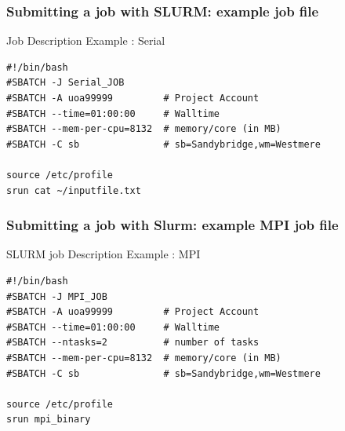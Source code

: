 \documentclass{beamer}
\begin{document}
\begin{frame}
  \frametitle{Submitting a job with SLURM: example job file}
\begin{block}{Job Description Example : Serial}
\begin{scriptsize}
\begin{verbatim}
#!/bin/bash
#SBATCH -J Serial_JOB
#SBATCH -A uoa99999         # Project Account
#SBATCH --time=01:00:00     # Walltime
#SBATCH --mem-per-cpu=8132  # memory/core (in MB)
#SBATCH -C sb               # sb=Sandybridge,wm=Westmere

source /etc/profile
srun cat ~/inputfile.txt
\end{verbatim}
\end{scriptsize}
  \end{block}
\end{frame}


\begin{frame}
  \frametitle{Submitting a job with Slurm: example MPI job file}
     \begin{block}{SLURM job Description Example : MPI}
\begin{scriptsize}
\begin{verbatim}
#!/bin/bash
#SBATCH -J MPI_JOB
#SBATCH -A uoa99999         # Project Account
#SBATCH --time=01:00:00     # Walltime
#SBATCH --ntasks=2          # number of tasks
#SBATCH --mem-per-cpu=8132  # memory/core (in MB)
#SBATCH -C sb               # sb=Sandybridge,wm=Westmere

source /etc/profile
srun mpi_binary
\end{verbatim}
\end{scriptsize}
  \end{block}
\end{frame}


\end{document}
